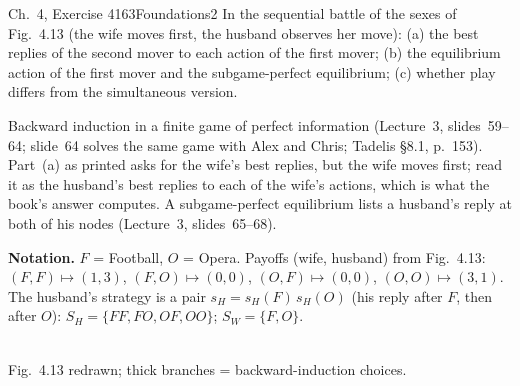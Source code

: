 \begin{exsol}{\MG{} Ch.~4, Exercise 4}{163}{Foundations}{2}
\asked In the sequential battle of the sexes of Fig.~4.13 (the wife moves first, the husband observes
her move): (a) the best replies of the second mover to each action of the first mover; (b) the
equilibrium action of the first mover and the subgame-perfect equilibrium; (c) whether play differs
from the simultaneous version.

\method Backward induction in a finite game of perfect information (Lecture~3, slides~59--64; slide~64
solves the same game with Alex and Chris; Tadelis \S8.1, p.~153). Part~(a) as printed asks for the
wife's best replies, but the wife moves first; read it as the husband's best replies to each of the
wife's actions, which is what the book's answer computes. A subgame-perfect equilibrium lists a
husband's reply at both of his nodes (Lecture~3, slides~65--68).

\solution
\textbf{Notation.} $F$ = Football, $O$ = Opera. Payoffs (wife, husband) from Fig.~4.13:
$(F,F)\mapsto(1,3)$, $(F,O)\mapsto(0,0)$, $(O,F)\mapsto(0,0)$, $(O,O)\mapsto(3,1)$. The husband's strategy
is a pair $s_H = s_H(F)\,s_H(O)$ (his reply after $F$, then after $O$): $S_H = \{FF, FO, OF, OO\}$;
$S_W = \{F, O\}$.
\begin{center}
\\[2pt]
{\footnotesize Fig.~4.13 redrawn; thick branches = backward-induction choices.}
\end{center}


\end{exsol}
